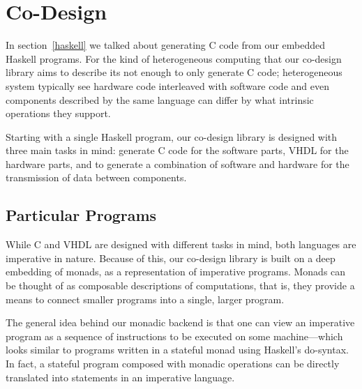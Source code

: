 \documentclass[../main.tex]{subfiles}
\begin{document}
\chapter{Co-Design}
\label{codesign}

In section~\ref{haskell} we talked about generating C code from our embedded Haskell programs. For the kind of heterogeneous computing that our co-design library aims to describe its not enough to only generate C code; heterogeneous system typically see hardware code interleaved with software code and even components described by the same language can differ by what intrinsic operations they support.

Starting with a single Haskell program, our co-design library is designed with three main tasks in mind: generate C code for the software parts, VHDL for the hardware parts, and to generate a combination of software and hardware for the transmission of data between components.


\section{Particular Programs}
\label{program}

While C and VHDL are designed with different tasks in mind, both languages are imperative in nature. Because of this, our co-design library is built on a deep embedding of monads, as a representation of imperative programs. Monads can be thought of as composable descriptions of computations, that is, they provide a means to connect smaller programs into a single, larger program.

The general idea behind our monadic backend is that one can view an imperative program as a sequence of instructions to be executed on some machine---which looks similar to programs written in a stateful monad using Haskell's do-syntax. In fact, a stateful program composed with monadic operations can be directly translated into statements in an imperative language.

\end{document}
